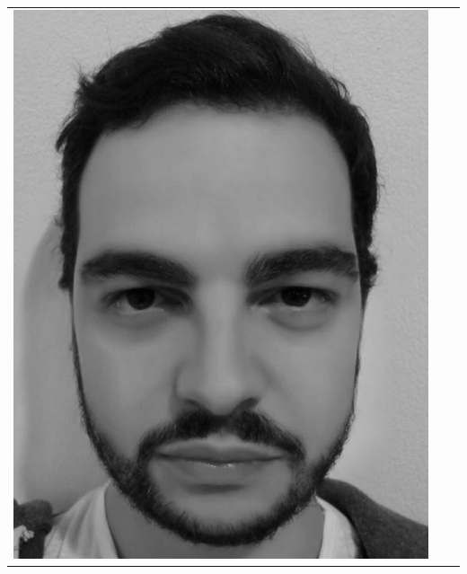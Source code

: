 \documentclass[11pt]{article}
\begin{document}
\begin{tabular}{ | c | c | c |  }
   \includegraphics[scale = 0.18]{img/martella.jpg}
\end{tabular}
\end{document}
